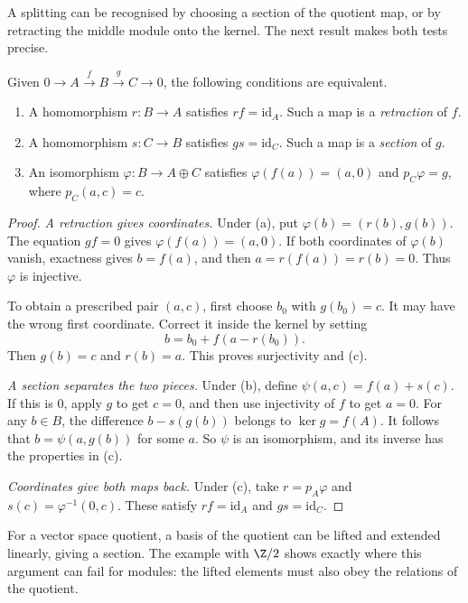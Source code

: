 A splitting can be recognised by choosing a section of the quotient map, or by retracting the middle module onto the kernel. The next result makes both tests precise.

\begin{proposition}\label{prop:split}
Given $0\to A\xrightarrow f B\xrightarrow g C\to0$, the following conditions are equivalent.
\begin{enumerate}[label=(\alph*)]
\item A homomorphism $r\colon B\to A$ satisfies $rf=\mathrm{id}_A$. Such a map is a \emph{retraction} of $f$.
\item A homomorphism $s\colon C\to B$ satisfies $gs=\mathrm{id}_C$. Such a map is a \emph{section} of $g$.
\item An isomorphism $\varphi\colon B\to A\oplus C$ satisfies $\varphi(f(a))=(a,0)$ and $p_C\varphi=g$, where $p_C(a,c)=c$.
\end{enumerate}
\end{proposition}

\begin{proof}
\emph{A retraction gives coordinates.} Under (a), put $\varphi(b)=(r(b),g(b))$. The equation $gf=0$ gives $\varphi(f(a))=(a,0)$. If both coordinates of $\varphi(b)$ vanish, exactness gives $b=f(a)$, and then $a=r(f(a))=r(b)=0$. Thus $\varphi$ is injective.

To obtain a prescribed pair $(a,c)$, first choose $b_0$ with $g(b_0)=c$. It may have the wrong first coordinate. Correct it inside the kernel by setting
\[
b=b_0+f(a-r(b_0)).
\]
Then $g(b)=c$ and $r(b)=a$. This proves surjectivity and (c).

\emph{A section separates the two pieces.} Under (b), define $\psi(a,c)=f(a)+s(c)$. If this is $0$, apply $g$ to get $c=0$, and then use injectivity of $f$ to get $a=0$. For any $b\in B$, the difference $b-s(g(b))$ belongs to $\ker g=f(A)$. It follows that $b=\psi(a,g(b))$ for some $a$. So $\psi$ is an isomorphism, and its inverse has the properties in (c).

\emph{Coordinates give both maps back.} Under (c), take $r=p_A\varphi$ and $s(c)=\varphi^{-1}(0,c)$. These satisfy $rf=\mathrm{id}_A$ and $gs=\mathrm{id}_C$.
\end{proof}

For a vector space quotient, a basis of the quotient can be lifted and extended linearly, giving a section. The example with $\Z/2$ shows exactly where this argument can fail for modules: the lifted elements must also obey the relations of the quotient.

